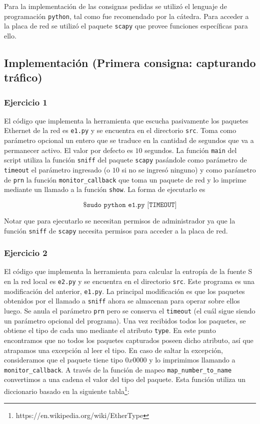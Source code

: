 Para la implementación de las consignas pedidas se utilizó el lenguaje de programación \texttt{python}, tal como
fue recomendado por la cátedra. Para acceder a la placa de red se utilizó el paquete \texttt{scapy} que provee
funciones específicas para ello.

\subsection{Implementación (Primera consigna: capturando tráfico)}

\subsubsection{Ejercicio 1}
El código que implementa la herramienta que escucha pasivamente los paquetes Ethernet de la red es \texttt{e1.py}
y se encuentra en el directorio \texttt{src}. Toma como parámetro opcional un entero que se traduce en la cantidad
de segundos que va a permanecer activo. El valor por defecto es $10$ segundos. La función \texttt{main} del script
utiliza la función \texttt{sniff} del paquete \texttt{scapy} pasándole como parámetro de \texttt{timeout} el
parámetro ingresado (o $10$ si no se ingresó ninguno) y como parámetro de \texttt{prn} la función
\texttt{monitor\_callback} que toma un paquete de red y lo imprime mediante un llamado a la función \texttt{show}.
La forma de ejecutarlo es

\[
\texttt{\$ sudo python e1.py [TIMEOUT]}
\]

Notar que para ejecutarlo se necesitan permisos de administrador ya que la función \texttt{sniff} de \texttt{scapy}
necesita permisos para acceder a la placa de red.

\subsubsection{Ejercicio 2}
El código que implementa la herramienta para calcular la entropía de la fuente S en la red local es \texttt{e2.py}
y se encuentra en el directorio \texttt{src}. Este programa es una modificación del anterior, \texttt{e1.py}.
La principal modificación es que los paquetes obtenidos por el llamado a \texttt{sniff} ahora se almacenan para
operar sobre ellos luego. Se anula el parámetro \texttt{prn} pero se conserva el \texttt{timeout} (el cuál sigue
siendo un parámetro opcional del programa). Una vez recibidos todos los paquetes, se obtiene el tipo de cada uno
mediante el atributo \texttt{type}. En este punto encontramos que no todos los paquetes capturados poseen dicho
atributo, así que atrapamos una excepción al leer el tipo. En caso de saltar la excepción, consideramos que el
paquete tiene tipo $0x0000$ y lo imprimimos llamando a \texttt{monitor\_callback}. A través de la función de
mapeo \texttt{map\_number\_to\_name} convertimos a una cadena el valor del tipo del paquete. Esta función
utiliza un diccionario basado en la siguiente tabla\footnote{https://en.wikipedia.org/wiki/EtherType}:

